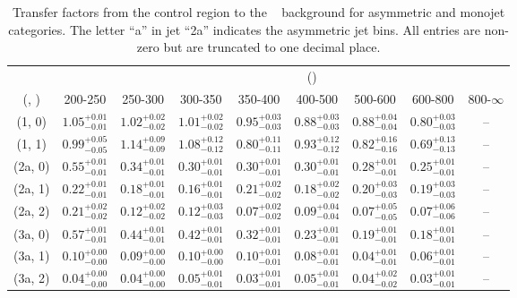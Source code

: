 \begin{table}[h!]
\tiny
\centering
\caption{Transfer factors from the \mj control region to the \zInv~ background for asymmetric and monojet categories. The letter ``a'' in jet \eg ``2a''  indicates the asymmetric jet bins. All entries are non-zero but are truncated to one decimal place.\label{tab:tf_mu_zinv_asym}}
\begin{tabular}
{ccccccccc}
	\hline\hline
&	& \multicolumn{8}{c}{\scalht (\gev)} \\ 
	 (\njet,  \nb) & 200-250 & 250-300 & 300-350 & 350-400 & 400-500 & 500-600 & 600-800 & 800-$\infty$ \\ [0.8ex] 
\hline
	(1, 0) & $1.05^{+ 0.01 }_{- 0.01 }$ & $1.02^{+ 0.02 }_{- 0.02 }$ & $1.01^{+ 0.02 }_{- 0.02 }$ & $0.95^{+ 0.03 }_{- 0.03 }$ & $0.88^{+ 0.03 }_{- 0.03 }$ & $0.88^{+ 0.04 }_{- 0.04 }$ & $0.80^{+ 0.03 }_{- 0.03 }$ & -- \\[0.5ex] 
	(1, 1) & $0.99^{+ 0.05 }_{- 0.05 }$ & $1.14^{+ 0.09 }_{- 0.09 }$ & $1.08^{+ 0.12 }_{- 0.12 }$ & $0.80^{+ 0.11 }_{- 0.11 }$ & $0.93^{+ 0.12 }_{- 0.12 }$ & $0.82^{+ 0.16 }_{- 0.16 }$ & $0.69^{+ 0.13 }_{- 0.13 }$ & -- \\[0.5ex] 
	(2a, 0) & $0.55^{+ 0.01 }_{- 0.01 }$ & $0.34^{+ 0.01 }_{- 0.01 }$ & $0.30^{+ 0.01 }_{- 0.01 }$ & $0.30^{+ 0.01 }_{- 0.01 }$ & $0.30^{+ 0.01 }_{- 0.01 }$ & $0.28^{+ 0.01 }_{- 0.01 }$ & $0.25^{+ 0.01 }_{- 0.01 }$ & -- \\[0.5ex] 
	(2a, 1) & $0.22^{+ 0.01 }_{- 0.01 }$ & $0.18^{+ 0.01 }_{- 0.01 }$ & $0.16^{+ 0.01 }_{- 0.01 }$ & $0.21^{+ 0.02 }_{- 0.02 }$ & $0.18^{+ 0.02 }_{- 0.02 }$ & $0.20^{+ 0.03 }_{- 0.03 }$ & $0.19^{+ 0.03 }_{- 0.03 }$ & -- \\[0.5ex] 
	(2a, 2) & $0.21^{+ 0.02 }_{- 0.02 }$ & $0.12^{+ 0.02 }_{- 0.02 }$ & $0.12^{+ 0.03 }_{- 0.03 }$ & $0.07^{+ 0.02 }_{- 0.02 }$ & $0.09^{+ 0.04 }_{- 0.04 }$ & $0.07^{+ 0.05 }_{- 0.05 }$ & $0.07^{+ 0.06 }_{- 0.06 }$ & -- \\[0.5ex] 
	(3a, 0) & $0.57^{+ 0.01 }_{- 0.01 }$ & $0.44^{+ 0.01 }_{- 0.01 }$ & $0.42^{+ 0.01 }_{- 0.01 }$ & $0.32^{+ 0.01 }_{- 0.01 }$ & $0.23^{+ 0.01 }_{- 0.01 }$ & $0.19^{+ 0.01 }_{- 0.01 }$ & $0.18^{+ 0.01 }_{- 0.01 }$ & -- \\[0.5ex] 
	(3a, 1) & $0.10^{+ 0.00 }_{- 0.00 }$ & $0.09^{+ 0.00 }_{- 0.00 }$ & $0.10^{+ 0.00 }_{- 0.00 }$ & $0.10^{+ 0.01 }_{- 0.01 }$ & $0.08^{+ 0.01 }_{- 0.01 }$ & $0.04^{+ 0.01 }_{- 0.01 }$ & $0.06^{+ 0.01 }_{- 0.01 }$ & -- \\[0.5ex] 
	(3a, 2) & $0.04^{+ 0.00 }_{- 0.00 }$ & $0.04^{+ 0.00 }_{- 0.00 }$ & $0.05^{+ 0.01 }_{- 0.01 }$ & $0.03^{+ 0.01 }_{- 0.01 }$ & $0.05^{+ 0.01 }_{- 0.01 }$ & $0.04^{+ 0.02 }_{- 0.02 }$ & $0.03^{+ 0.01 }_{- 0.01 }$ & -- \\[0.5ex] 

\end{tabular}
\end{table}
